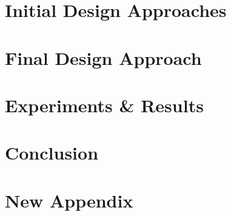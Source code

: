 \documentclass[12pt,twoside,a4paper]{report}
\begin{document}
    \chapter{Initial Design Approaches}
    \label{chapter:INITIAL}
    
    \chapter{Final Design Approach}
    \label{chapter:FINAL}
    
    \chapter{Experiments \& Results}
    \label{chapter:RESULT}
    
    \chapter{Conclusion}
    \label{chapter:CONC}
    
    
    
    
    \appendix    
    
    \chapter{New Appendix}
    
\end{document}
